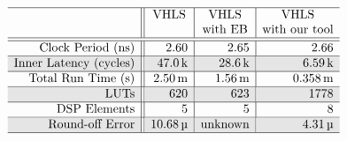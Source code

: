 \begin{table}[ht]
    \centering
    \renewcommand\arraycolsep{1.0mm}
    \newcommand\unitk{\,\text{k}}
    \newcommand\unitm{\,\text{m}}
    \newcommand\unitmu{\,\text{\textmu}}
    \newcommand\unitM{\,\text{M}}
    \newcommand\unitG{\,\text{G}}
    \newcommand\Mid[1]{\multirow{2}*{$#1$}}
    \newcommand\Shade{\cellcolor{black!10}}
    \newcommand\name[1]{\texttt{\scriptsize #1}}
    \vspace{8pt}
    $\begin{array}{r||r|r|r}
        \hline
        \multicolumn{1}{c||}{} &
        \multicolumn{1}{c|}{\text{VHLS}} &
        \multicolumn{1}{c|}{\text{VHLS}} &
        \multicolumn{1}{c}{\text{VHLS}} \\

        & &
        \multicolumn{1}{c|}{\text{with EB}} &
        \multicolumn{1}{c}{\text{with our tool}} \\ \hline\hline

        \text{Clock Period (ns)} &
        2.60 & 2.65 & 2.66 \\ \hline

        \Shade \text{Inner Latency (cycles)} &
        \Shade 47.0\unitk & \Shade 28.6\unitk & \Shade 6.59\unitk \\ \hline

        \text{Total Run Time (s)} &
        2.50\unitm & 1.56\unitm & 0.358\unitm \\ \hline

        \Shade \text{LUTs} &
        \Shade 620 & \Shade 623 & \Shade 1778 \\ \hline

        \text{DSP Elements} &
        5 & 5 & 8 \\ \hline

        \Shade \text{Round-off Error} &
        \Shade 10.68\unitmu &
        \Shade \text{unknown} &
        \Shade 4.31\unitmu \\ \hline
    \end{array}$
    \vspace{8pt}
    \caption{%
        Comparison among the optimized implementations generated by Vivado
        HLS's expression balancing and our optimizer.}
    \label{tab:seidel_results}
\end{table}
